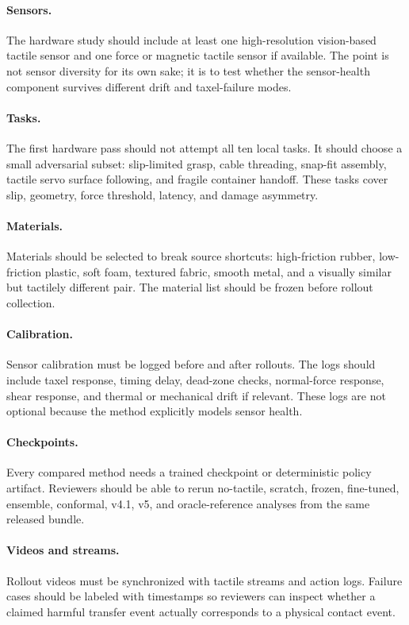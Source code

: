 \documentclass{article}
\begin{document}
\paragraph{Sensors.}
The hardware study should include at least one high-resolution vision-based tactile sensor and one force or magnetic tactile sensor if available. The point is not sensor diversity for its own sake; it is to test whether the sensor-health component survives different drift and taxel-failure modes.

\paragraph{Tasks.}
The first hardware pass should not attempt all ten local tasks. It should choose a small adversarial subset: slip-limited grasp, cable threading, snap-fit assembly, tactile servo surface following, and fragile container handoff. These tasks cover slip, geometry, force threshold, latency, and damage asymmetry.

\paragraph{Materials.}
Materials should be selected to break source shortcuts: high-friction rubber, low-friction plastic, soft foam, textured fabric, smooth metal, and a visually similar but tactilely different pair. The material list should be frozen before rollout collection.

\paragraph{Calibration.}
Sensor calibration must be logged before and after rollouts. The logs should include taxel response, timing delay, dead-zone checks, normal-force response, shear response, and thermal or mechanical drift if relevant. These logs are not optional because the method explicitly models sensor health.

\paragraph{Checkpoints.}
Every compared method needs a trained checkpoint or deterministic policy artifact. Reviewers should be able to rerun no-tactile, scratch, frozen, fine-tuned, ensemble, conformal, v4.1, v5, and oracle-reference analyses from the same released bundle.

\paragraph{Videos and streams.}
Rollout videos must be synchronized with tactile streams and action logs. Failure cases should be labeled with timestamps so reviewers can inspect whether a claimed harmful transfer event actually corresponds to a physical contact event.
\end{document}
